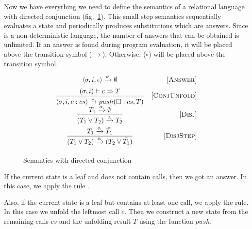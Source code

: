 
Now we have everything we need to define the semantics of a relational language with directed conjunction (fig.~\ref{fair:classic-semantics}). This small step semantics sequentially evaluates a state and periodically produces substitutions which are answers. Since \mk is a non-deterministic language, the number of answers that can be obtained is unlimited. If an answer is found during program evaluation, it will be placed above the transition symbol ($\xrightarrow{}$). Otherwise, ($\circ$) will be placed above the transition symbol.

\begin{figure}[h!]
\[\begin{array}{cr}

      {\langle \sigma, i, \epsilon \rangle \xrightarrow{\sigma} \emptyset}
&     \mbox{[\textsc{Answer}]} \\[2mm]
\dfrac{(\sigma, i) \vdash c \Rightarrow T}
      {\langle \sigma, i, c : cs \rangle \xrightarrow{\circ} push(\Box : cs, T)}
&     \mbox{[\textsc{ConjUnfold}]} \\[2mm]
\dfrac{T_1 \xrightarrow{\alpha} \emptyset}
      {(T_1 \lor T_2) \xrightarrow{\alpha} T_2}
&     \mbox{[\textsc{Disj}]} \\[4mm]
\dfrac{T_1 \xrightarrow{\alpha} \bar{T_1}}
      {(T_1 \lor T_2) \xrightarrow{\alpha} (T_2 \lor\bar{T_1})}
&     \mbox{[\textsc{DisjStep}]} \\[4mm]
\end{array}\]
\caption{Semantics with directed conjunction}
\label{fair:classic-semantics}
\end{figure}

If the current state is a leaf and does not contain calls, then we got an answer. In this case, we apply the rule .

Also, if the current state is a leaf but contains at least one call, we apply the  rule. In this case we unfold the leftmost call $c$. Then we construct a new state from the remaining calls $cs$ and the unfolding result $T$ using the function $push$.

